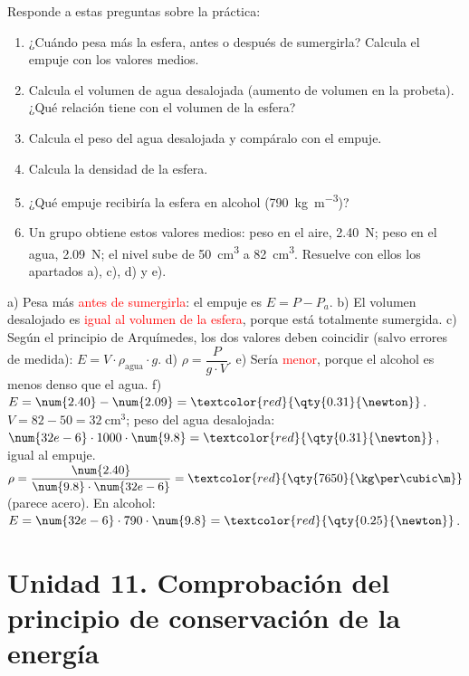 \begin{exercise}
    Responde a estas preguntas sobre la práctica:
    \begin{enumerate}[label=\alph*)]
        \item ¿Cuándo pesa más la esfera, antes o después de sumergirla? Calcula el empuje con los valores medios.
        \item Calcula el volumen de agua desalojada (aumento de volumen en la probeta). ¿Qué relación tiene con el volumen de la esfera?
        \item Calcula el peso del agua desalojada y compáralo con el empuje.
        \item Calcula la densidad de la esfera.
        \item ¿Qué empuje recibiría la esfera en alcohol (\qty{790}{\kg\per\cubic\m})?
        \item Un grupo obtiene estos valores medios: peso en el aire, \qty{2.40}{\newton}; peso en el agua, \qty{2.09}{\newton}; el nivel sube de \qty{50}{\cubic\cm} a \qty{82}{\cubic\cm}. Resuelve con ellos los apartados a), c), d) y e).
    \end{enumerate}
    \begin{solu}
        a) Pesa más \textcolor{red}{antes de sumergirla}: el empuje es \(E = P - P_a\).
        b) El volumen desalojado es \textcolor{red}{igual al volumen de la esfera}, porque está totalmente sumergida.
        c) Según el principio de Arquímedes, los dos valores deben coincidir (salvo errores de medida): \(E = V \cdot \rho_{\text{agua}} \cdot g\).
        d) \(\rho = \dfrac{P}{g \cdot V}\).
        e) Sería \textcolor{red}{menor}, porque el alcohol es menos denso que el agua.
        f) \(E = \num{2.40} - \num{2.09} = \textcolor{red}{\qty{0.31}{\newton}}\). \(V = 82 - 50 = \qty{32}{\cubic\cm}\); peso del agua desalojada: \(\num{32e-6} \cdot 1000 \cdot \num{9.8} = \textcolor{red}{\qty{0.31}{\newton}}\), igual al empuje.
        \(\rho = \dfrac{\num{2.40}}{\num{9.8} \cdot \num{32e-6}} = \textcolor{red}{\qty{7650}{\kg\per\cubic\m}}\) (parece acero). En alcohol: \(E = \num{32e-6} \cdot 790 \cdot \num{9.8} = \textcolor{red}{\qty{0.25}{\newton}}\).
    \end{solu}
\end{exercise}

\section[Unidad 11. Conservación de la energía]{Unidad 11. Comprobación del principio de conservación de la energía}


